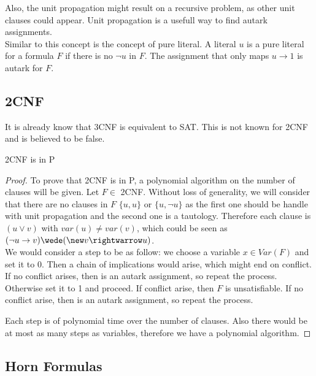 Also, the unit propagation might result on a recursive problem, as other unit clauses could appear. Unit propagation is a usefull way to find autark assignments. \\ 


Similar to this concept is the concept of pure literal. A literal $u$ is a pure literal for a formula $F$ if there is no $\neg u$ in $F$. The assignment that only maps $u\to 1$ is autark for $F$.



\subsection{2CNF}
It is already know that 3CNF is equivalent to SAT. This is not known for 2CNF and is believed to be false.

\begin{proposition}
  2CNF is in P 
\end{proposition}
\begin{proof}

  To prove that 2CNF is in P, a polynomial algorithm on the number of clauses will be given. Let $F \in$ 2CNF.  Without loss of generality, we will consider that there are no clauses in $F$ $\{u,u\}$ or $\{u,\neg u\}$ as the first one should be handle with unit propagation and the second one is a tautology. Therefore each clause is $(u \vee v)$ with $var(u) \ne var(v)$, which could be seen as $(\neg u \rightarrow v) \wede (\new v \rightwarrow u)$.\\


  
  We would consider a step to be as follow: we choose a variable $x \in Var(F)$ and set it to 0. Then a chain of implications would arise, which might end on conflict. If no conflict arises, then is an autark assignment, so repeat the process. Otherwise set it to 1 and proceed. If conflict arise, then $F$ is unsatisfiable. If no conflict arise, then is an autark assignment, so repeat the process.
  

  Each step is of polynomial time over the number of clauses. Also there would be at most as many steps as variables, therefore we have a polynomial algorithm.
  
 
\end{proof}

\subsection{Horn Formulas}

